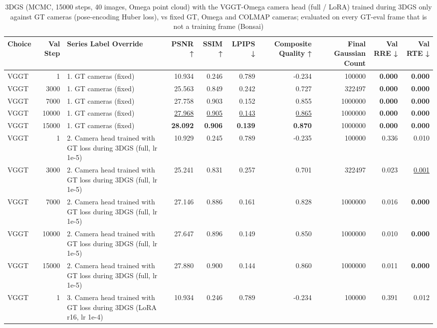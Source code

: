 \begin{table}[H]
\caption{\ifdefined\customcaption \customcaption \else 3DGS (MCMC, 15000 steps, 40 images, Omega point cloud) with the VGGT-Omega camera head (full / LoRA) trained during 3DGS only against GT cameras (pose-encoding Huber loss), vs fixed GT, Omega and COLMAP cameras; evaluated on every GT-eval frame that is not a training frame (Bonsai) \fi}
\label{tab:104_omega_camft_gt_15k_bonsai}
\centering
\tiny
\begin{tabular}{lrlrrrrrrr}
\toprule
Choice & Val Step & Series Label Override & PSNR ↑ & SSIM ↑ & LPIPS ↓ & Composite Quality ↑ & Final Gaussian Count & Val RRE ↓ & Val RTE ↓ \\
\midrule
VGGT & 1 & 1. GT cameras (fixed) & 10.934 & 0.246 & 0.789 & -0.234 & 100000 & \textbf{0.000} & \textbf{0.000} \\
VGGT & 3000 & 1. GT cameras (fixed) & 25.563 & 0.849 & 0.242 & 0.727 & 322497 & \textbf{0.000} & \textbf{0.000} \\
VGGT & 7000 & 1. GT cameras (fixed) & 27.758 & 0.903 & 0.152 & 0.855 & 1000000 & \textbf{0.000} & \textbf{0.000} \\
VGGT & 10000 & 1. GT cameras (fixed) & \underline{27.968} & \underline{0.905} & \underline{0.143} & \underline{0.865} & 1000000 & \textbf{0.000} & \textbf{0.000} \\
VGGT & 15000 & 1. GT cameras (fixed) & \textbf{28.092} & \textbf{0.906} & \textbf{0.139} & \textbf{0.870} & 1000000 & \textbf{0.000} & \textbf{0.000} \\
VGGT & 1 & 2. Camera head trained with GT loss during 3DGS (full, lr 1e-5) & 10.929 & 0.245 & 0.789 & -0.235 & 100000 & 0.336 & 0.010 \\
VGGT & 3000 & 2. Camera head trained with GT loss during 3DGS (full, lr 1e-5) & 25.241 & 0.831 & 0.257 & 0.701 & 322497 & 0.023 & \underline{0.001} \\
VGGT & 7000 & 2. Camera head trained with GT loss during 3DGS (full, lr 1e-5) & 27.146 & 0.886 & 0.161 & 0.828 & 1000000 & 0.016 & \textbf{0.000} \\
VGGT & 10000 & 2. Camera head trained with GT loss during 3DGS (full, lr 1e-5) & 27.647 & 0.896 & 0.149 & 0.850 & 1000000 & 0.010 & \textbf{0.000} \\
VGGT & 15000 & 2. Camera head trained with GT loss during 3DGS (full, lr 1e-5) & 27.880 & 0.900 & 0.144 & 0.860 & 1000000 & 0.011 & \textbf{0.000} \\
VGGT & 1 & 3. Camera head trained with GT loss during 3DGS (LoRA r16, lr 1e-4) & 10.934 & 0.246 & 0.789 & -0.234 & 100000 & 0.391 & 0.012 \\

\end{tabular}
\end{table}
